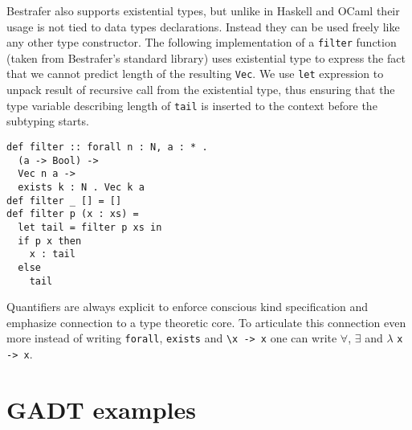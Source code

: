 \documentclass[declaration,shortabstract,english]{iithesis}
\begin{document}
Bestrafer also supports existential types, but unlike in Haskell and OCaml their usage is not tied to data types declarations.
Instead they can be used freely like any other type constructor. The following implementation of a \verb+filter+ function
(taken from Bestrafer's standard library) uses existential type to express the fact that we cannot predict length of
the resulting \verb+Vec+. We use \verb+let+ expression to unpack result of recursive call from the existential type, thus
ensuring that the type variable describing length of \verb+tail+ is inserted to the context before the subtyping starts.
\begin{verbatim}
def filter :: forall n : N, a : * .
  (a -> Bool) ->
  Vec n a ->
  exists k : N . Vec k a
def filter _ [] = []
def filter p (x : xs) =
  let tail = filter p xs in
  if p x then
    x : tail
  else
    tail
\end{verbatim}

Quantifiers are always explicit to enforce conscious kind specification and emphasize connection to a type theoretic core.
To articulate this connection even more instead of writing \verb+forall+, \verb+exists+ and \verb+\x -> x+ one can write
$\forall$, $\exists$ and $\lambda$ \verb+x -> x+.
\section{GADT examples}
\end{document}
